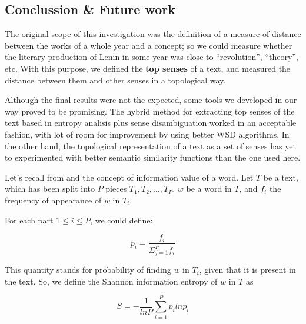 \documentclass{pnastwo}
\begin{document}
\begin{article}
\section{Conclussion \& Future work}

The original scope of this investigation was the definition of a measure of distance between the works of a whole year and a concept; so we could measure whether the literary production of Lenin in some year was close to ``revolution'', ``theory'', etc.  With this purpose, we defined the \textbf{top senses} of a text, and measured the distance between them and other senses in a topological way.

Although the final results were not the expected, some tools we developed in our way proved to be promising. The hybrid method for extracting top senses of the text based in entropy analisis plus sense disambiguation worked in an acceptable fashion, with lot of room for improvement by using better WSD algorithms. In the other hand, the topological representation of a text as a set of senses has yet to experimented with better semantic similarity functions than the one used here. 

% 
% 
% 
% 
% 

\label{appendix1}
Let's recall from \cite{DARWIN} and \cite{ENTROPIC} the concept of information value of a word.
Let $T$ be a text, which has been split into $P$ pieces $T_1, T_2, \dots, T_P$, $w$ be a word in $T$,
and $f_i$ the frequency of appearance of $w$ in $T_i$.

For each part $1 \leq i \leq P$, we could define:

\begin{equation}
  p_i = \frac{f_i}{\Sigma_{j=1}^{P}f_i}
\end{equation}

This quantity stands for probability of finding $w$ in $T_i$, given that it is present in the text. So, 
we define the Shannon information entropy of $w$ in $T$ as

\begin{equation}
  S = -\frac{1}{ln P}\sum_{i=1}^{P}p_i ln p_i
\end{equation}




\end{article}
\end{document}
